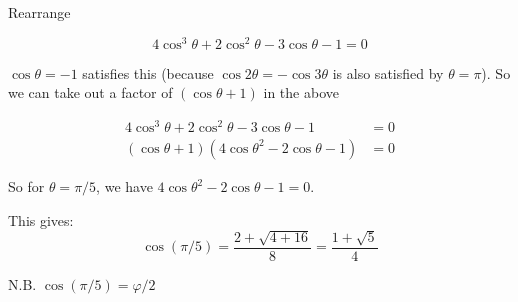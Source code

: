 \documentclass[11pt]{amsart}
\begin{document}
Rearrange

$$
4 \cos^3 \theta
+ 2 \cos^2 \theta
 - 3 \cos \theta 
 - 1
=0
$$

$\cos \theta = -1$ satisfies this (because $\cos 2 \theta = - \cos 3 \theta$ is also satisfied by $\theta = \pi$). So we can take out a factor of $(\cos \theta + 1)$ in the above

$$
\begin{aligned}
4 \cos^3 \theta
+ 2 \cos^2 \theta
 - 3 \cos \theta 
 - 1
&=0
\\
(\cos \theta + 1)
(4 \cos \theta^2 - 2 \cos \theta - 1)
&=0
\end{aligned}
$$

So for $\theta = \pi / 5$, we have $4 \cos \theta^2 - 2 \cos \theta - 1 = 0$.

This gives:
$$
\cos (\pi/5)
=
\frac{2 + \sqrt{4 + 16}}{8} = \frac{1 + \sqrt{5}}{4}
$$


N.B. $\cos (\pi / 5) = \varphi / 2$
\end{document}
